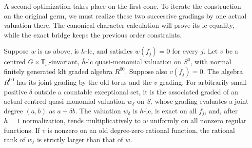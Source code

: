 A second optimization takes place on the first cone.  To iterate the
construction on the original germ, we must realize these two successive
gradings by one actual valuation there.  The canonical-character
calculation will prove its lc equality, while the exact bridge keeps the
previous order constraints.

\begin{lemma}[Compression]\label{lem:F-compression}
Suppose $w$ is as above, is $h$-lc, and satisfies $w(f_j)=0$ for
every $j$. Let $v$ be a centred
$G\times\mathbb T_w$-invariant, $\bar h$-lc quasi-monomial
valuation on $S^0$, with normal finitely generated klt graded
algebra $R^{00}$.  Suppose also $v(\bar f_j)=0$.
The algebra $R^{00}$ has its joint grading by the old torus and
the $v$-grading.  For arbitrarily small positive $\delta$ outside
a countable exceptional set, it is the associated graded of an
actual centred quasi-monomial valuation $w_\delta$ on $S$, whose
grading evaluates a joint degree $(a,b)$ as $a+\delta b$.
The valuation $w_\delta$ is $h$-lc, is exact on all $f_j$, and,
after $h=1$ normalization, tends multiplicatively to $w$
uniformly on all nonzero regular functions.  If $v$ is nonzero
on an old degree-zero rational function, the rational rank of
$w_\delta$ is strictly larger than that of $w$.
\end{lemma}

